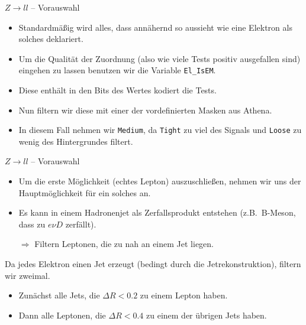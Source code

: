 \documentclass{beamer}
\begin{document}
\begin{frame}{$Z \to ll$ -- Vorauswahl}
  \begin{itemize}
    \item Standardmäßig wird alles, dass annähernd so aussieht wie eine Elektron
      als solches deklariert. \pause

    \item Um die Qualität der Zuordnung (also wie viele Tests positiv
      ausgefallen sind) eingehen zu lassen benutzen wir die Variable
      \lstinline'El_IsEM'. \pause

    \item Diese enthält in den Bits des Wertes kodiert die Tests. \pause

    \item Nun filtern wir diese mit einer der vordefinierten Masken aus Athena.
      \pause

    \item In diesem Fall nehmen wir \lstinline'Medium', da \lstinline'Tight' zu
      viel des Signals und \lstinline'Loose' zu wenig des Hintergrundes filtert.
  \end{itemize}
\end{frame}

\begin{frame}{$Z \to ll$ -- Vorauswahl}
  \begin{itemize}
    \item Um die erste Möglichkeit (echtes Lepton) auszuschließen, nehmen wir
      uns der Hauptmöglichkeit für ein solches an.

    \item Es kann in einem Hadronenjet als Zerfallsprodukt entstehen (z.B.\
      B-Meson, dass zu $e\nu D$ zerfällt). \pause

    \item[$\Rightarrow$] Filtern Leptonen, die zu nah an einem Jet liegen.
  \end{itemize} \pause

  Da jedes Elektron einen Jet erzeugt (bedingt durch die Jetrekonstruktion),
  filtern wir zweimal.

  \begin{itemize}
    \item Zunächst alle Jets, die $\Delta R < 0.2$ zu einem Lepton haben.
    \item Dann alle Leptonen, die $\Delta R < 0.4$ zu einem der übrigen Jets haben.
  \end{itemize}
\end{frame}
\end{document}
